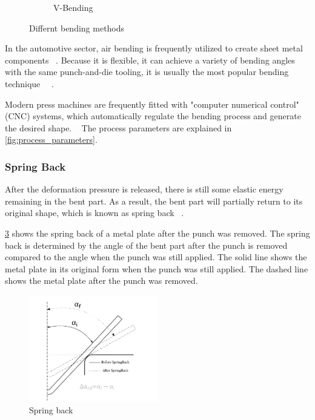 \begin{figure}[h]
\begin{tcolorbox}[arc=0pt,boxrule=0.5pt, colback=white]
\begin{subfigure}{0.4\textwidth}
            \caption{V-Bending}
            \label{fig:v-bending}
        \end{subfigure}
        \hfill
    \end{tcolorbox}
    \caption{Differnt bending methods~\cite[pp. 416]{groover_fundamentalsmodernmanufacturing_2020}}
    \label{fig:bending-methods}
\end{figure}

In the automotive sector, air bending is frequently utilized to create sheet metal components
~\cite[p. 342]{kim_predictionbendallowance_2007}.
Because it is flexible, it can achieve a variety of bending angles with the same punch-and-die tooling, it
is usually the most popular bending technique
~\cite[p. 3]{miranda_formingspringbackprediction_2018}~\cite[p. 1]{cruz_applicationmachinelearning_2021}.

Modern press machines are frequently fitted with "computer numerical control" (CNC) systems, which automatically
regulate the bending process and generate the desired shape.
~\cite[p. 3]{miranda_formingspringbackprediction_2018}
The process parameters are explained in \cref{fig:process_parameters}.

\subsubsection{Spring Back}\label{subsubsec:spring-back}
After the deformation pressure is released, there is still
some elastic energy remaining in the bent part.
As a result, the bent part will partially return to its original
shape, which is known as spring back
~\cite[p. 413--414]{groover_fundamentalsmodernmanufacturing_2020}.

\cref{fig:spring-back} shows the spring back of a metal plate after the punch was removed.
The spring back is determined by the angle of the bent part after the punch is removed compared to the angle when
the punch was still applied.
The solid line shows the metal plate in its original form when the punch was still
applied.
The dashed line shows the metal plate after the punch was removed.

\begin{figure}[h]
    \centering
    \includegraphics[width=0.5\textwidth]{chap3/images/spring-back}
    \caption{Spring back~\cite[p. 5]{cruz_applicationmachinelearning_2021}}
    \label{fig:spring-back}
\end{figure}

